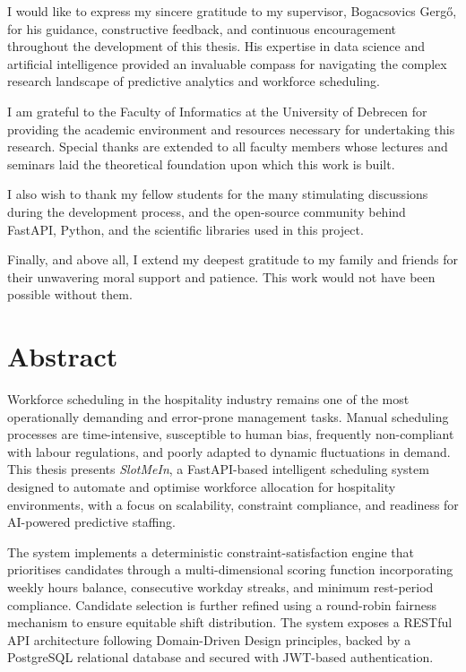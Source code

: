 \documentclass[12pt,a4paper]{report}
\begin{document}
I would like to express my sincere gratitude to my supervisor, Bogacsovics Gergő, for his guidance, constructive feedback, and continuous encouragement throughout the development of this thesis. His expertise in data science and artificial intelligence provided an invaluable compass for navigating the complex research landscape of predictive analytics and workforce scheduling.

I am grateful to the Faculty of Informatics at the University of Debrecen for providing the academic environment and resources necessary for undertaking this research. Special thanks are extended to all faculty members whose lectures and seminars laid the theoretical foundation upon which this work is built.

I also wish to thank my fellow students for the many stimulating discussions during the development process, and the open-source community behind FastAPI, Python, and the scientific libraries used in this project.

Finally, and above all, I extend my deepest gratitude to my family and friends for their unwavering moral support and patience. This work would not have been possible without them.

\tableofcontents
\listoffigures
\listoftables

\chapter*{Abstract}

Workforce scheduling in the hospitality industry remains one of the most operationally demanding and error-prone management tasks. Manual scheduling processes are time-intensive, susceptible to human bias, frequently non-compliant with labour regulations, and poorly adapted to dynamic fluctuations in demand. This thesis presents \textit{SlotMeIn}, a FastAPI-based intelligent scheduling system designed to automate and optimise workforce allocation for hospitality environments, with a focus on scalability, constraint compliance, and readiness for AI-powered predictive staffing.

The system implements a deterministic constraint-satisfaction engine that prioritises candidates through a multi-dimensional scoring function incorporating weekly hours balance, consecutive workday streaks, and minimum rest-period compliance. Candidate selection is further refined using a round-robin fairness mechanism to ensure equitable shift distribution. The system exposes a RESTful API architecture following Domain-Driven Design principles, backed by a PostgreSQL relational database and secured with JWT-based authentication.
\end{document}
